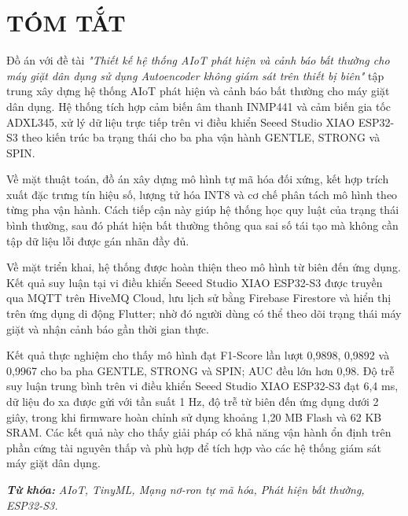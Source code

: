 \chapter*{TÓM TẮT}
\fontsize{13}{15}\selectfont

\begin{sloppypar}
Đồ án với đề tài \textit{"Thiết kế hệ thống AIoT phát hiện và cảnh báo bất thường cho máy giặt dân dụng sử dụng Autoencoder không giám sát trên thiết bị biên"} tập trung xây dựng hệ thống AIoT phát hiện và cảnh báo bất thường cho máy giặt dân dụng. Hệ thống tích hợp cảm biến âm thanh INMP441 và cảm biến gia tốc ADXL345, xử lý dữ liệu trực tiếp trên vi điều khiển Seeed Studio XIAO ESP32-S3 theo kiến trúc ba trạng thái cho ba pha vận hành GENTLE, STRONG và SPIN.
\end{sloppypar}

Về mặt thuật toán, đồ án xây dựng mô hình tự mã hóa đối xứng, kết hợp trích xuất đặc trưng tín hiệu số, lượng tử hóa INT8 và cơ chế phân tách mô hình theo từng pha vận hành. Cách tiếp cận này giúp hệ thống học quy luật của trạng thái bình thường, sau đó phát hiện bất thường thông qua sai số tái tạo mà không cần tập dữ liệu lỗi được gán nhãn đầy đủ.

Về mặt triển khai, hệ thống được hoàn thiện theo mô hình từ biên đến ứng dụng. Kết quả suy luận tại vi điều khiển Seeed Studio XIAO ESP32-S3 được truyền qua MQTT trên HiveMQ Cloud, lưu lịch sử bằng Firebase Firestore và hiển thị trên ứng dụng di động Flutter; nhờ đó người dùng có thể theo dõi trạng thái máy giặt và nhận cảnh báo gần thời gian thực.

Kết quả thực nghiệm cho thấy mô hình đạt F1-Score lần lượt 0,9898, 0,9892 và 0,9967 cho ba pha GENTLE, STRONG và SPIN; AUC đều lớn hơn 0,98. Độ trễ suy luận trung bình trên vi điều khiển Seeed Studio XIAO ESP32-S3 đạt 6,4 ms, dữ liệu đo xa được gửi với tần suất 1 Hz, độ trễ từ biên đến ứng dụng dưới 2 giây, trong khi firmware hoàn chỉnh sử dụng khoảng 1,20 MB Flash và 62 KB SRAM. Các kết quả này cho thấy giải pháp có khả năng vận hành ổn định trên phần cứng tài nguyên thấp và phù hợp để tích hợp vào các hệ thống giám sát máy giặt dân dụng.

\vspace{0.5cm}
\textbf{\textit{Từ khóa:}} \textit{AIoT, TinyML, Mạng nơ-ron tự mã hóa, Phát hiện bất thường, ESP32-S3.}
